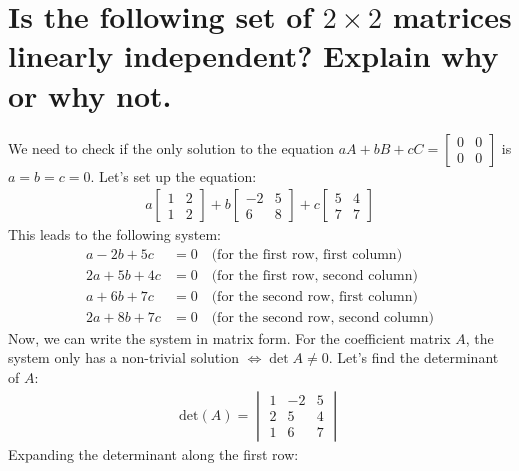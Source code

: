 \documentclass[
  letterpaper,
  DIV=11,
  numbers=noendperiod]{scrartcl}
\begin{document}
\newpage{}

\section{\texorpdfstring{Is the following set of \(2 \times 2\) matrices
linearly independent? Explain why or why
not.}{Is the following set of 2 \textbackslash times 2 matrices linearly independent? Explain why or why not.}}\label{is-the-following-set-of-2-times-2-matrices-linearly-independent-explain-why-or-why-not.}

We need to check if the only solution to the equation
\(aA + bB + cC = \begin{bmatrix}0&0\\0&0\end{bmatrix}\) is
\(a = b = c = 0\). Let's set up the equation: \begin{align*}
a \begin{bmatrix}1&2\\1&2\end{bmatrix} + b \begin{bmatrix}-2&5\\6&8\end{bmatrix} + c \begin{bmatrix}5&4\\7&7\end{bmatrix}
\end{align*} This leads to the following system: \begin{align*}
a - 2b + 5c &= 0 \quad \text{(for the first row, first column)} \\
2a + 5b + 4c &= 0 \quad \text{(for the first row, second column)} \\
a + 6b + 7c &= 0 \quad \text{(for the second row, first column)} \\
2a + 8b + 7c &= 0 \quad \text{(for the second row, second column)}
\end{align*} Now, we can write the system in matrix form. For the
coefficient matrix \(A\), the system only has a non-trivial solution
\(\iff \det{A} \ne 0\). Let's find the determinant of \(A\):
\begin{align*}
\text{det}(A) = \begin{vmatrix} 1 & -2 & 5 \\ 2 & 5 & 4 \\ 1 & 6 & 7 \end{vmatrix}
\end{align*} Expanding the determinant along the first row:
\end{document}

